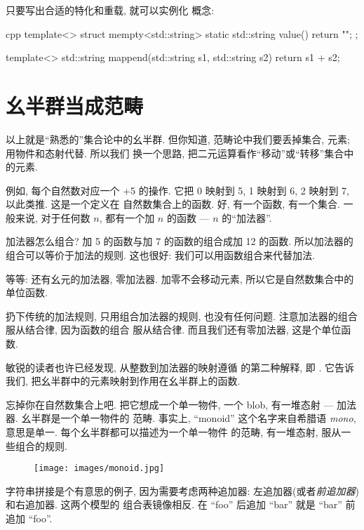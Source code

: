只要写出合适的特化和重载, 就可以实例化  概念:

\begin{snip}{cpp}
template<>
struct mempty<std::string> {
    static std::string value() { return ""; }
};

template<>
std::string mappend(std::string s1, std::string s2) {
    return s1 + s2;
}
\end{snip}

\section{幺半群当成范畴}

以上就是``熟悉的''集合论中的幺半群. 但你知道, 范畴论中我们要丢掉集合, 元素; 用物件和态射代替. 所以我们
换一个思路, 把二元运算看作``移动''或``转移''集合中的元素.

例如, 每个自然数对应一个 +5 的操作. 它把 0 映射到 5, 1 映射到 6, 2 映射到 7, 以此类推. 这是一个定义在
自然数集合上的函数. 好, 有一个函数, 有一个集合. 一般来说, 对于任何数 $n$, 都有一个加 $n$ 的函数 ---
$n$ 的``加法器''.

加法器怎么组合? 加 5 的函数与加 7 的函数的组合成加 12 的函数. 所以加法器的组合可以等价于加法的规则.
这也很好: 我们可以用函数组合来代替加法.

等等: 还有幺元的加法器, 零加法器. 加零不会移动元素, 所以它是自然数集合中的单位函数.

扔下传统的加法规则, 只用组合加法器的规则, 也没有任何问题. 注意加法器的组合服从结合律, 因为函数的组合
服从结合律. 而且我们还有零加法器, 这是个单位函数.

敏锐的读者也许已经发现, 从整数到加法器的映射遵循  的第二种解释, 即 .
它告诉我们,  把幺半群中的元素映射到作用在幺半群上的函数.

忘掉你在自然数集合上吧. 把它想成一个单一物件, 一个 blob, 有一堆态射 --- 加法器. 幺半群是一个单一物件的
范畴. 事实上, ``monoid'' 这个名字来自希腊语 \emph{mono}, 意思是单一. 每个幺半群都可以描述为一个单一物件
的范畴, 有一堆态射, 服从一些组合的规则.


\begin{figure}[H]
  \centering
  \texttt{[image: images/monoid.jpg]}
\end{figure}

\noindent
字符串拼接是个有意思的例子, 因为需要考虑两种追加器: 左追加器(或者\emph{前追加器})和右追加器. 这两个模型的
组合表镜像相反. 在 ``foo'' 后追加 ``bar'' 就是 ``bar'' 前追加 ``foo''.

